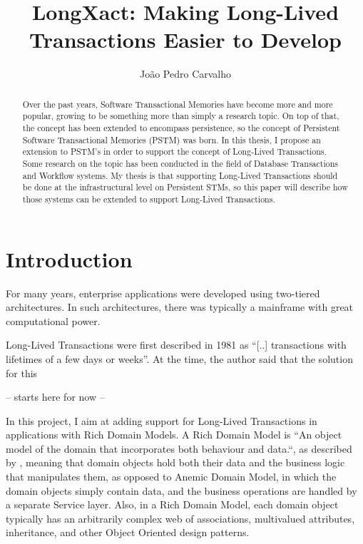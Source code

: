 \documentclass{llncs}
\begin{document}
\title{LongXact: Making Long-Lived Transactions Easier to Develop}

\author{Jo\~{a}o Pedro Carvalho} 
\maketitle


\begin{abstract}
  Over the past years, Software Transactional Memories have become
  more and more popular, growing to be something more than simply a
  research topic. On top of that, the concept has been extended to
  encompass persistence, so the concept of Persistent Software
  Transactional Memories (PSTM) was born. In this thesis, I propose an
  extension to PSTM's in order to support the concept of Long-Lived
  Transactions. Some research on the topic has been conducted in the
  field of Database Transactions and Workflow systems. My thesis is
  that supporting Long-Lived Transactions should be done at the
  infrastructural level on Persistent STMs, so this paper will
  describe how those systems can be extended to support Long-Lived
  Transactions.
\end{abstract}


\section{Introduction}

For many years, enterprise applications were developed using
two-tiered architectures. In such architectures, there was typically a
mainframe with great computational power.

Long-Lived Transactions were first described in 1981 as ``[..]
transactions with lifetimes of a few days or
weeks''\cite{gray1981transaction}. At the time, the author said that
the solution for this

-- starts here for now --

In this project, I aim at adding support for Long-Lived Transactions
in applications with Rich Domain Models.  A Rich Domain Model is ``An
object model of the domain that incorporates both behaviour and
data.``, as described by \cite{fowler2003patterns}, meaning that
domain objects hold both their data and the business logic that
manipulates them, as opposed to Anemic Domain Model, in which the
domain objects simply contain data, and the business operations are
handled by a separate Service layer. Also, in a Rich Domain Model,
each domain object typically has an arbitrarily complex web of
associations, multivalued attributes, inheritance, and other Object
Oriented design patterns.
\end{document}
